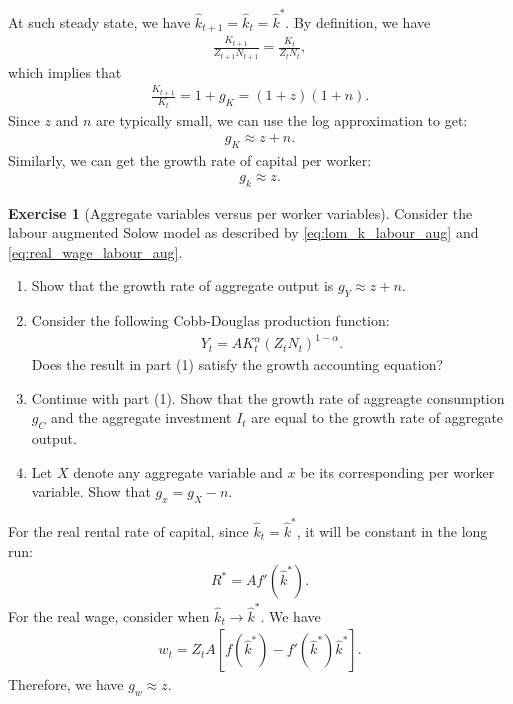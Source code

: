 \documentclass{book}
\theoremstyle{definition}
\newtheorem{exercise}{Exercise}[chapter]
\theoremstyle{plain}
\begin{document}
At such steady state, we have $\hat{k}_{t+1} = \hat{k}_t = \hat{k}^*$. By definition, we have
\begin{align*}
    \frac{K_{t+1}}{Z_{t+1} N_{t+1}} = \frac{K_{t}}{Z_t N_t},
\end{align*}
which implies that
\begin{align}\label{eq:bgp_k_growth}
    \frac{K_{t+1}}{K_t} = 1+g_K = (1+z)(1+n).
\end{align}
Since $z$ and $n$ are typically small, we can use the log approximation to get:
\begin{align*}
    g_K \approx z + n.
\end{align*}
Similarly, we can get the growth rate of capital per worker:
\begin{align*}
    g_k \approx z.
\end{align*}

\begin{exercise}[Aggregate variables versus per worker variables]
    Consider the labour augmented Solow model as described by \eqref{eq:lom_k_labour_aug} and \eqref{eq:real_wage_labour_aug}.
    \begin{enumerate}[label=(\arabic*)]
        \item Show that the growth rate of aggregate output is $g_Y \approx z + n$. 
        \item Consider the following Cobb-Douglas production function:
        \begin{align*}
            Y_t = A K_t^{\alpha} (Z_t N_t)^{1-\alpha}.
        \end{align*}
        Does the result in part (1) satisfy the growth accounting equation?
        \item Continue with part (1). Show that the growth rate of aggreagte consumption $g_C$ and the aggregate investment $I_t$ are equal to the growth rate of aggregate output.
        \item Let $X$ denote any aggregate variable and $x$ be its corresponding per worker variable. Show that $g_x = g_X - n$.
    \end{enumerate}
\end{exercise}

For the real rental rate of capital, since $\hat{k}_t = \hat{k}^*$, it will be constant in the long run:
\begin{align*}
    R^* = A f'(\hat{k}^*).
\end{align*}
For the real wage, consider when $\hat{k}_t \rightarrow \hat{k}^*$. We have
\begin{align*}
    w_t = Z_t A \left[f(\hat{k}^*) - f'(\hat{k}^*)\hat{k}^*\right].
\end{align*}
Therefore, we have $g_w \approx z$.
\end{document}
